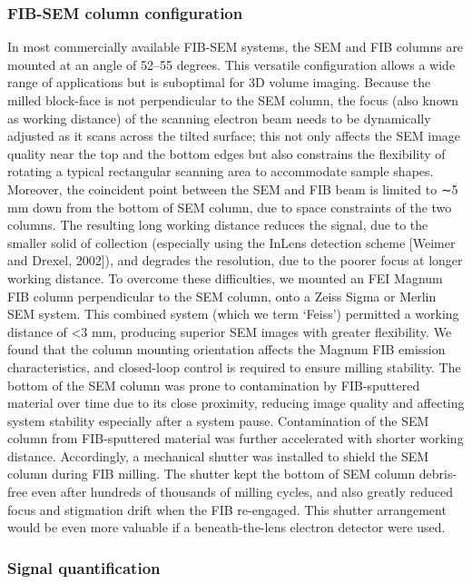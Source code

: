 \documentclass{article}
\begin{document}
\subsubsection*{FIB-SEM column configuration}

In most commercially available FIB-SEM systems, the SEM and FIB columns are mounted at an angle of 52–55 degrees. This versatile configuration allows a wide range of applications but is suboptimal for 3D volume imaging. Because the milled block-face is not perpendicular to the SEM column, the focus (also known as working distance) of the scanning electron beam needs to be dynamically adjusted as it scans across the tilted surface; this not only affects the SEM image quality near the top and the bottom edges but also constrains the flexibility of rotating a typical rectangular scanning area to accommodate sample shapes. Moreover, the coincident point between the SEM and FIB beam is limited to ∼5 mm down from the bottom of SEM column, due to space constraints of the two columns. The resulting long working distance reduces the signal, due to the smaller solid of collection (especially using the InLens detection scheme [Weimer and Drexel, 2002]), and degrades the resolution, due to the poorer focus at longer working distance. To overcome these difficulties, we mounted an FEI Magnum FIB column perpendicular to the SEM column, onto a Zeiss Sigma or Merlin SEM system. This combined system (which we term ‘Feiss’) permitted a working distance of <3 mm, producing superior SEM images with greater flexibility. We found that the column mounting orientation affects the Magnum FIB emission characteristics, and closed-loop control is required to ensure milling stability. The bottom of the SEM column was prone to contamination by FIB-sputtered material over time due to its close proximity, reducing image quality and affecting system stability especially after a system pause. Contamination of the SEM column from FIB-sputtered material was further accelerated with shorter working distance. Accordingly, a mechanical shutter was installed to shield the SEM column during FIB milling. The shutter kept the bottom of SEM column debris-free even after hundreds of thousands of milling cycles, and also greatly reduced focus and stigmation drift when the FIB re-engaged. This shutter arrangement would be even more valuable if a beneath-the-lens electron detector were used.

\subsubsection*{Signal quantification}
\end{document}
